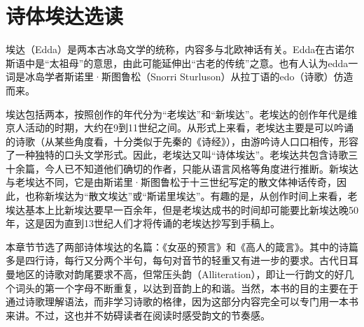 \chapter{诗体埃达选读}
埃达（Edda）是两本古冰岛文学的统称，内容多与北欧神话有关。Edda在古诺尔斯语中是“太祖母”的意思，由此可能延伸出“古老的传统”之意。也有人认为edda一词是冰岛学者斯诺里·斯图鲁松（Snorri Sturluson）从拉丁语的edo（诗歌）仿造而来。

埃达包括两本，按照创作的年代分为“老埃达”和“新埃达”。老埃达的创作年代是维京人活动的时期，大约在9到11世纪之间。从形式上来看，老埃达主要是可以吟诵的诗歌（从某些角度看，十分类似于先秦的《诗经》），由游吟诗人口口相传，形容了一种独特的口头文学形式。因此，老埃达又叫“诗体埃达”。老埃达共包含诗歌三十余篇，今人已不知道他们确切的作者，只能从语言风格等角度进行推断。新埃达与老埃达不同，它是由斯诺里·斯图鲁松于十三世纪写定的散文体神话传奇，因此，也称新埃达为“散文埃达”或“斯诺里埃达”。有趣的是，从创作时间上来看，老埃达基本上比新埃达要早一百余年，但是老埃达成书的时间却可能要比新埃达晚50年，这是因为直到13世纪人们才将传诵的老埃达抄写到手稿上。

本章节节选了两部诗体埃达的名篇：《女巫的预言》和《高人的箴言》。其中的诗篇多是四行诗，每行又分两个半句，每句对音节的轻重又有进一步的要求。古代日耳曼地区的诗歌对韵尾要求不高，但常压头韵（Alliteration），即让一行韵文的好几个词头的第一个字母不断重复，以达到音韵上的和谐。当然，本书的目的主要在于通过诗歌理解语法，而非学习诗歌的格律，因为这部分内容完全可以专门用一本书来讲。不过，这也并不妨碍读者在阅读时感受韵文的节奏感。
